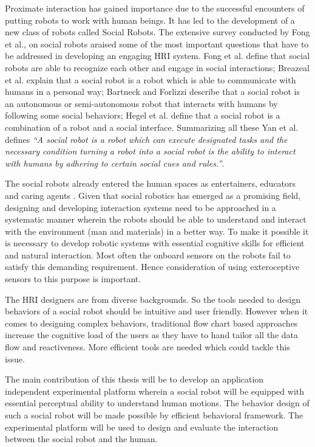 	Proximate interaction has gained importance due to the successful encounters of putting robots to work with human beings. It has led to the development of a new class of robots called Social Robots. The extensive survey conducted by Fong et al., \cite{fong2003survey} on social robots araised some of the most important questions that have to be addressed in developing an engaging HRI system. Fong et al. \cite{fong2003survey} define that social robots are able to recognize each other and engage in social interactions; Breazeal et al. \cite{Breazeal:2002:DSR:515422} explain that a social robot is a robot which is able to communicate with humans in a personal way; Bartneck and Forlizzi \cite{bartneck2004design} describe that a social robot is an autonomous or semi-autonomous robot that interacts with humans by following some social behaviors; Hegel et al. \cite{hegel2009understanding} define that a social robot is a combination of a robot and a social interface. Summarizing all these Yan et al. \cite{yan2014survey} defines \emph{“A social robot is a robot which can execute designated tasks and the necessary condition turning a robot into a social robot is the ability to interact with humans by adhering to certain social cues and rules.”}. 
	
	The social robots already entered the human spaces as entertainers, educators \cite{NaoRobot} and caring agents \cite{ASKNao}. Given that social robotics has emerged as a promising field, designing and developing interaction systems need to be approached in a systematic manner wherein the robots should be able to understand and interact with the environment (man and materials) in a better way. To make it possible it is necessary to develop robotic systems with essential cognitive skills for efficient and natural interaction. Most often the onboard sensors on the robots fail to satisfy this demanding requirement. Hence consideration of using exteroceptive sensors to this purpose is important.  
	
	The HRI designers are from diverse backgrounds. So the tools needed to design behaviors of a social robot should be intuitive and user friendly. However when it comes to designing complex behaviors, traditional flow chart based approaches \cite{Choregraphe} increase the cognitive load of the users as they have to hand tailor all the data flow and reactiveness. More efficient tools are needed which could tackle this issue. 
	
	The main contribution of this thesis will be to develop an application independent experimental platform wherein a social robot will be equipped with essential perceptual ability to understand human motions. The behavior design of such a social robot will be made possible by efficient behavioral framework. The experimental platform will be used to design and evaluate the interaction between the social robot and the human.	

